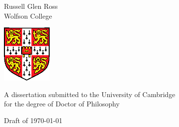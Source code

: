 
\begin{titlepage}
\begin{center}
\vspace*{\fill}

\huge
\thesistitlebig

\vfill
\vfill

\huge
Russell Glen Ross\\[6mm]
\large
Wolfson College

\vfill
\includegraphics[width=70pt]{figures/camshield}
\vfill

\large
A dissertation submitted to the University of Cambridge\\
for the degree of Doctor of Philosophy

\vfill

Draft of \today

\vspace*{\fill}
\end{center}
\end{titlepage}
